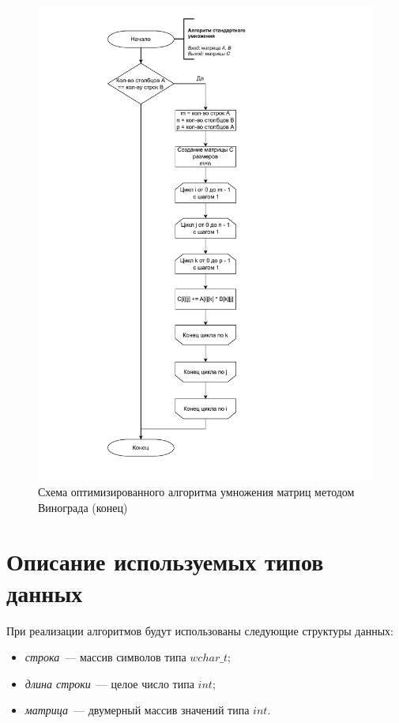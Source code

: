 \begin{figure}[h]
	\centering
	\includegraphics[height=0.9\textheight, page=5]{img/algorithms.pdf}
	\caption{Схема оптимизированного алгоритма умножения матриц методом Винограда (конец)}
	\label{fig:VinogradOpt2}
\end{figure}

\clearpage

\section{Описание используемых типов данных}
При реализации алгоритмов будут использованы следующие структуры данных:

\begin{itemize}
	\item \textit{строка}~--- массив символов типа $wchar{\_}t$;
	\item \textit{длина строки}~--- целое число типа $int$;
	\item \textit{матрица}~--- двумерный массив значений типа $int$.
\end{itemize}

